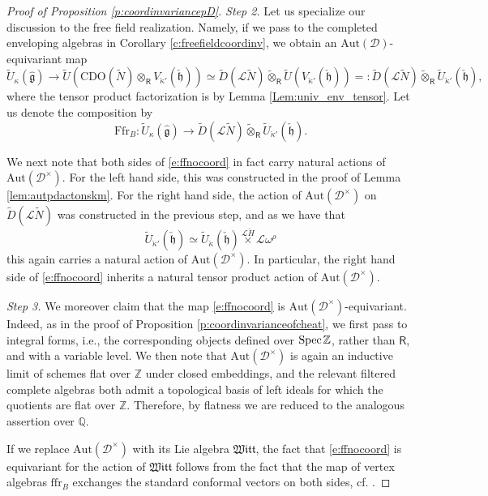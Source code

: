 \documentclass{amsart}
\theoremstyle{definition}
\newcommand{\fh}{\mathfrak{h}}
\newcommand{\fg}{\mathfrak{g}}
\newcommand{\Spec}{\on{Spec}\hspace{.5mm}}
\newcommand{\sD}{\mathscr{D}}
\newcommand{\on}{\mathrm}
\newcommand{\Ring}{\mathsf{R}}
\newcommand{\Z}{\mathbb{Z}}
\newcommand{\Loop}{\mathscr{L}}
\newcommand{\CDO}{\mathrm{CDO}}
\newcommand{\pD}{\sD^\times}
\newcommand{\ckappa}{\check{\kappa}}
\newcommand{\Aut}{\on{Aut}}
\numberwithin{equation}{section}
\begin{document}
\begin{proof}[Proof of Proposition \ref{p:coordinvariancepD}]
{\em Step 2.} Let us specialize our discussion to the free field realization. Namely, if we pass to the completed enveloping algebras in Corollary \ref{c:freefieldcoordinv}, we obtain an $\Aut(\sD)$-equivariant map
$$\widetilde{U}_\kappa(\hat{\fg}) \rightarrow \widetilde{U}(\CDO(\tilde{N}) \otimes_\Ring V_{\ckappa'}(\check{\fh})) \simeq \widetilde{D}(\Loop \tilde{N}) \widetilde{\otimes}_\Ring \widetilde{U}( V_{\ckappa'}(\check{\fh})) =: \widetilde{D}(\Loop \tilde{N}) \widetilde{\otimes}_\Ring \widetilde{U}_{\ckappa'}(\check{\fh}),$$
where the tensor product factorization is by Lemma \ref{Lem:univ_env_tensor}. Let us denote the composition by
\begin{equation} \label{e:ffnocoord} \on{Ffr}_B: \widetilde{U}_\kappa(\hat{\fg}) \rightarrow \widetilde{D}(\Loop \tilde{N}) \widetilde{\otimes}_\Ring \widetilde{U}_{\ckappa'}(\check{\fh}). \end{equation}

We next note that both sides of \eqref{e:ffnocoord} in fact carry natural actions of $\Aut(\pD)$. For the left hand side, this was constructed in the proof of Lemma \ref{lem:autpdactonskm}. For the right hand side, the action of $\Aut(\pD)$ on $\widetilde{D}(\Loop \tilde{N})$ was constructed in the previous step, and as we have that 
$$\widetilde{U}_{\ckappa'}(\check{\fh}) \simeq \widetilde{U}_{\ckappa}(\check{\fh}) \overset{\Loop \check{H}} \times \Loop \omega^{\rho}$$
 this again carries a natural action of $\Aut(\pD)$. In particular, the right hand side of \eqref{e:ffnocoord} inherits a natural tensor product action of $\Aut(\pD)$. 

{\em Step 3.} We moreover claim that the map \eqref{e:ffnocoord} is $\Aut(\pD)$-equivariant. 
Indeed, as in the proof of Proposition \ref{p:coordinvarianceofcheat}, we first pass to integral forms, i.e., the corresponding objects defined over $\Spec \Z$, rather than $\Ring$, and with a variable level.  We then note that $\Aut(\pD)$ is again an inductive limit of schemes flat over $\Z$ under closed embeddings, and the relevant filtered complete algebras both admit a topological basis of left ideals for which the quotients are flat over $\Z$. Therefore, by  flatness we are reduced to the analogous assertion over $\mathbb{Q}$.

If we replace $\Aut(\pD)$ with its Lie algebra $\mathfrak{Witt}$, the fact that \eqref{e:ffnocoord} is equivariant for the action of $\mathfrak{Witt}$ follows from the fact that the map of vertex algebras $\on{ffr}_B$ exchanges the standard conformal vectors on both sides, cf. \cite[Proposition 6.2.2]{Frenkel_loop}.


\end{proof}
\end{document}

